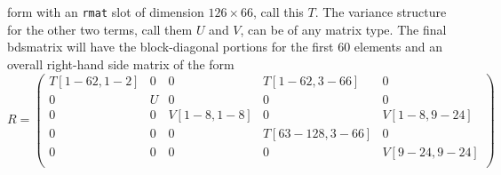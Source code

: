 \documentclass{article}
\begin{document}
form with an \Verb!rmat! slot of dimension $126 \times 66$, call this $T$.
The variance structure for the other two terms, call them $U$ and
$V$, can be of any matrix type.
The final bdsmatrix will have the block-diagonal portions for the
first 60 elements
and an overall right-hand side matrix of the form
$$
R= \left( \begin{array}{ccccc}
             T[1-62, 1-2] & 0 & 0 &T[1-62, 3-66] &0\\
              0 & U &0 & 0 & 0 \\
              0 & 0 & V[1-8, 1-8] &0 & V[1-8, 9-24]\\
              0 & 0 & 0 & T[63-128, 3-66] & 0 \\
              0 & 0 & 0 & 0 & V[9-24,9-24] \\ \end{array} \right)
$$
\end{document}
